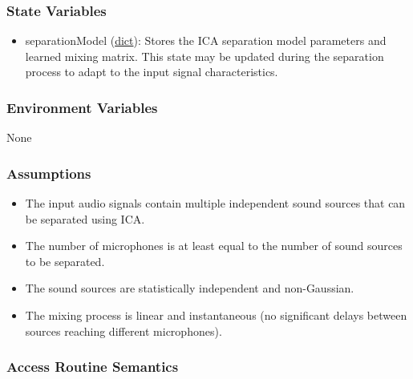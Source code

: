 \documentclass[12pt, titlepage]{article}
\begin{document}
\subsubsection{State Variables}

\begin{itemize}
  \item separationModel (\hyperref[ds:dict]{dict}): 
    \label{var:separationModel}
    Stores the ICA separation model parameters and learned mixing matrix. This
    state may be updated during the separation process to adapt to the input
    signal characteristics.
\end{itemize}

\subsubsection{Environment Variables}

None

\subsubsection{Assumptions}

\begin{itemize}
  \item The input audio signals contain multiple independent sound sources that
    can be separated using ICA.
  \item The number of microphones is at least equal to the number of sound
    sources to be separated.
  \item The sound sources are statistically independent and non-Gaussian.
  \item The mixing process is linear and instantaneous (no significant delays
    between sources reaching different microphones).
\end{itemize}

\subsubsection{Access Routine Semantics}
\end{document}
